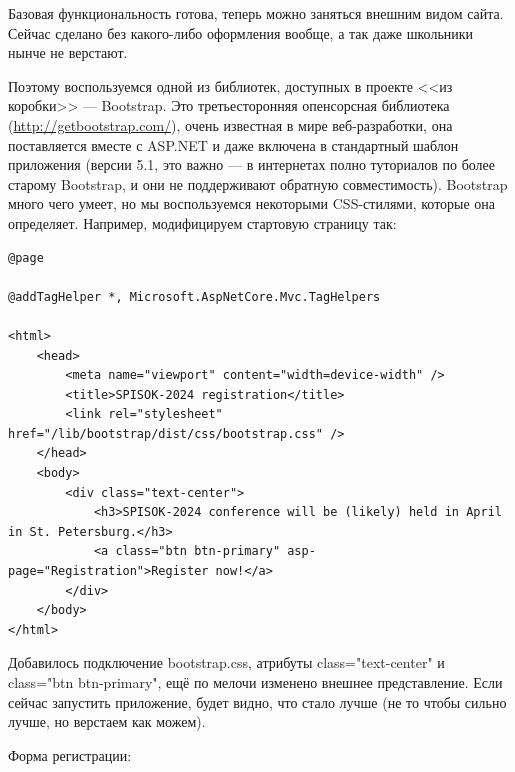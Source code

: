 \documentclass{../../text-style}
\begin{document}
Базовая функциональность готова, теперь можно заняться внешним видом сайта. Сейчас сделано без какого-либо оформления вообще, а так даже школьники нынче не верстают. 

Поэтому воспользуемся одной из библиотек, доступных в проекте <<из коробки>> --- Bootstrap. Это третьесторонняя опенсорсная библиотека 
(\url{http://getbootstrap.com/}), очень известная в мире веб-разработки, она поставляется вместе с ASP.NET и даже включена в стандартный шаблон приложения (версии 5.1, это важно --- в интернетах полно туториалов по более старому Bootstrap, и они не поддерживают обратную совместимость). Bootstrap много чего умеет, но мы воспользуемся некоторыми CSS-стилями, которые она определяет. Например, модифицируем
стартовую страницу так:

\begin{verbatim}
@page

@addTagHelper *, Microsoft.AspNetCore.Mvc.TagHelpers

<html>
    <head>
        <meta name="viewport" content="width=device-width" />
        <title>SPISOK-2024 registration</title>
        <link rel="stylesheet" href="/lib/bootstrap/dist/css/bootstrap.css" />
    </head>
    <body>
        <div class="text-center">
            <h3>SPISOK-2024 conference will be (likely) held in April in St. Petersburg.</h3>
            <a class="btn btn-primary" asp-page="Registration">Register now!</a>
        </div>
    </body>
</html>
\end{verbatim}

Добавилось подключение bootstrap.css, атрибуты class="text-center" и class="btn btn-primary", ещё по мелочи изменено внешнее представление. Если сейчас запустить приложение, будет видно, что стало лучше (не то чтобы сильно лучше, но верстаем как можем).

Форма регистрации:
\end{document}

